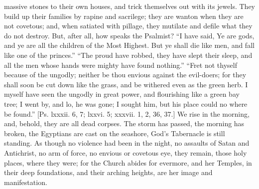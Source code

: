 massive stones to their own houses, and trick themselves out with its
jewels. They build up their families by rapine and sacrilege; they are
wanton when they are not covetous; and, when satiated with pillage,
they mutilate and defile what they do not destroy. But, after all, how
speaks the Psalmist? ``I have said, Ye are gods, and ye are all
the children of the Most Highest. But ye shall die like men, and fall
like one of the princes.'' ``The proud have robbed, they have
slept their sleep, and all the men whose hands were mighty have found
nothing.'' ``Fret not thyself because of the ungodly; neither
be thou envious against the evil-doers; for they shall soon be cut
down like the grass, and be withered even as the green herb. I myself
have seen the ungodly in great power, and flourishing like a green bay
tree; I went by, and lo, he was gone; I sought him, but his place
could no where be found.'' [Ps. lxxxii. 6, 7; lxxvi. 5; xxxvii. 1,
2, 36, 37.] We rise in the morning, and, behold, they are all dead
corpses. The storm has passed, the morning has broken, the Egyptians
are cast on the seashore, God's Tabernacle is still standing. As
though no violence had been in the night, no assaults of Satan and
Antichrist, no arm of force, no envious or covetous eye, they remain,
those holy places, where they were; for the Church abides for
evermore, and her Temples, in their deep foundations, and their
arching heights, are her image and manifestation.


